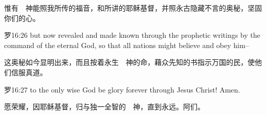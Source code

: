 \documentclass[a4paper,11pt,onecolumn,twoside]{ctexart}
\begin{document}
\begin{multicols}{2}
 惟有　神能照我所传的福音，和所讲的耶稣基督，并照永古隐藏不言的奥秘，坚固你们的心。


 罗16:26
 but now revealed and made known through the prophetic writings by the command of the eternal God, so that all nations might believe and obey him--

 这奥秘如今显明出来，而且按着永生　神的命，藉众先知的书指示万国的民，使他们信服真道。


 罗16:27
 to the only wise God be glory forever through Jesus Christ! Amen.

 愿荣耀，因耶稣基督，归与独一全智的　神，直到永远。阿们。

\end{multicols}
\clearpage
\end{document}
